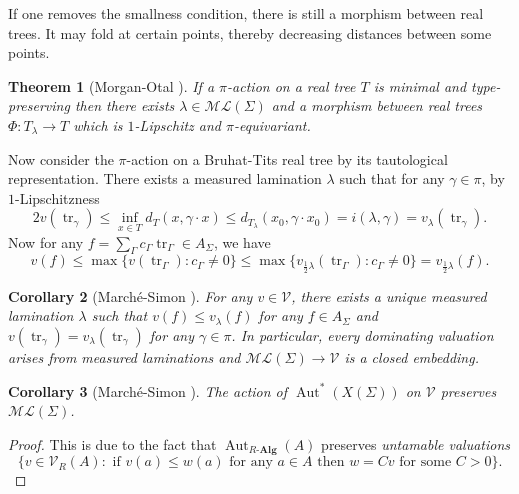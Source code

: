 \documentclass[11pt]{amsart}
\newtheorem{theorem}{Theorem}
\numberwithin{theorem}{section}
\newtheorem{corollary}[theorem]{Corollary}
\theoremstyle{definition}
\theoremstyle{remark}
\newcommand{\Vcal}{{\mathcal{V}}}
\DeclareMathOperator{\Aut}{Aut}
\DeclareMathOperator{\tr}{tr}
\newcommand{\<}{\langle}
\renewcommand{\>}{\rangle}
\begin{document}
If one removes the smallness condition, there is still a morphism between real trees. It may fold at certain points, thereby decreasing distances between some points.

\begin{theorem}[Morgan-Otal \cite{morgan1993relative}]
    If a $\pi$-action on a real tree $T$ is minimal and type-preserving then there exists $\lambda \in \mathcal{ML}(\Sigma)$ and a morphism between real trees $\Phi : T_\lambda \rightarrow T$ which is $1$-Lipschitz and $\pi$-equivariant.
\end{theorem}

Now consider the $\pi$-action on a Bruhat-Tits real tree by its tautological representation. There exists a measured lamination $\lambda$ such that for any $\gamma \in \pi$, by $1$-Lipschitzness
\[
2v(\tr_\gamma) \leq \inf_{x \in T}d_T(x, \gamma \cdot x) \leq d_{T_\lambda}(x_0, \gamma \cdot x_0) = i(\lambda, \gamma) = v_\lambda(\tr_\gamma).
\]
Now for any $f = \sum_{\Gamma} c_{\Gamma}\tr_{\Gamma} \in A_\Sigma$, we have
\[
v(f) \leq \max \{ v(\tr_\Gamma) : c_{\Gamma} \neq 0 \} \leq \max \{ v_{\frac 12 \lambda}(\tr_\Gamma) : c_{\Gamma} \neq 0 \} = v_{\frac 12 \lambda}(f).
\]

\begin{corollary}[March\'e-Simon \cite{marche2021automorphisms}]
    For any $v \in \Vcal$, there exists a unique measured lamination $\lambda$ such that $v(f) \leq v_\lambda(f)$ for any $f \in A_\Sigma$ and $v(\tr_\gamma) = v_\lambda(\tr_\gamma)$ for any $\gamma \in \pi$. In particular, every dominating valuation arises from measured laminations and $\mathcal{ML}(\Sigma) \rightarrow \Vcal$ is a closed embedding.
\end{corollary}

\begin{corollary}[March\'e-Simon \cite{marche2021automorphisms}]
    The action of $\Aut^*(X(\Sigma))$ on $\Vcal$ preserves $\mathcal{ML}(\Sigma)$.
\end{corollary}

\begin{proof}
    This is due to the fact that $\Aut_{R\text{-}\mathbf{Alg}}(A)$ preserves \textit{untamable valuations} 
    \[
    \{ v \in \Vcal_R(A) : \text{ if } v(a) \leq w(a) \text{ for any } a \in A \text{ then } w = Cv \text{ for some } C>0 \}.
    \]
\end{proof}
\end{document}
